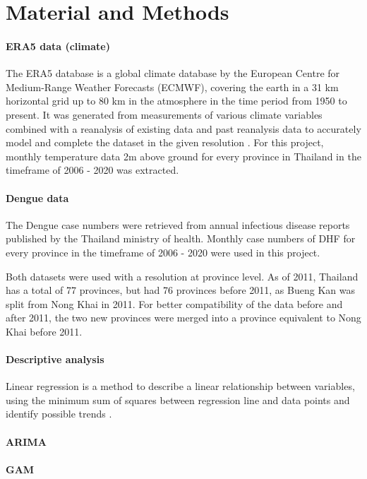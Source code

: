 \section{Material and Methods}

	\paragraph{ERA5 data (climate)}
	The ERA5 database is a global climate database by the European Centre for Medium-Range Weather Forecasts (ECMWF), covering the earth in a 31 km horizontal grid up to 80 km in the atmosphere in the time period from 1950 to present. It was generated from measurements of various climate variables combined with a reanalysis of existing data and past reanalysis data to accurately model and complete the dataset in the given resolution \citep{Hersbach2020}. For this project, monthly temperature data 2m above ground for every province in Thailand in the timeframe of 2006 - 2020 was extracted.
	\paragraph{Dengue data}
	The Dengue case numbers were retrieved from annual infectious disease reports published by the Thailand ministry of health. Monthly case numbers of DHF for every province in the timeframe of 2006 - 2020 were used in this project. 
	
	Both datasets were used with a resolution at province level. As of 2011, Thailand has a total of 77 provinces, but had 76 provinces before 2011, as Bueng Kan was split from Nong Khai in 2011. For better compatibility of the data before and after 2011, the two new provinces were merged into a province equivalent to Nong Khai before 2011. 
	
	\paragraph{Descriptive analysis}
	Linear regression is a method to describe a linear relationship between variables, using the minimum sum of squares between regression line and data points and identify possible trends \citep{Schneider2010}. 

	\paragraph{ARIMA}
	\paragraph{GAM}
	
